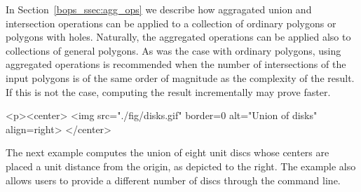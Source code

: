 In Section~\ref{bops_ssec:agg_ops} we describe how aggragated union
and intersection operations can be applied to a collection of ordinary
polygons or polygons with holes. Naturally, the aggregated operations
can be applied also to collections of general polygons. As was the
case with ordinary polygons, using aggregated operations is
recommended when the number of intersections of the input polygons
is of the same order of magnitude as the complexity of the result. If
this is not the case, computing the result incrementally may prove
faster.

\lcTex{%
  \setlength{\widthRight}{3.4cm}
  \setlength{\widthLeft}{\widthLineReal}
  \addtolength{\widthLeft}{-\widthRight}
  \begin{minipage}{\widthLeft}
}
\label{fig:disks}
\begin{ccHtmlOnly}
  <p><center>
    <img src="./fig/disks.gif" border=0 alt="Union of disks" align=right>
  </center>
\end{ccHtmlOnly}
The next example computes the union of eight unit discs whose centers are
placed a unit distance from the origin, as depicted to the right. The example
also allows users to provide a different number of discs through the command
line.

